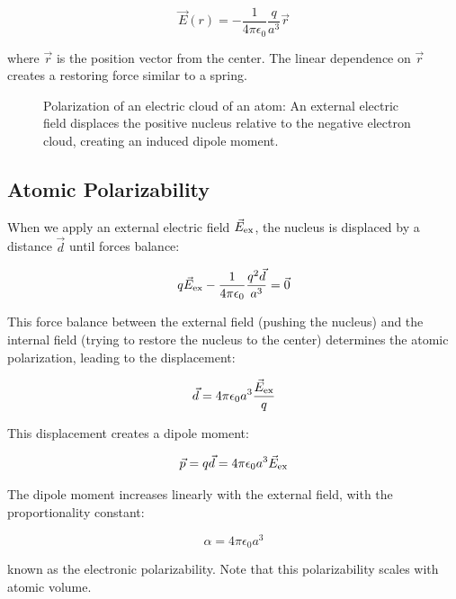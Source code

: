 \documentclass[
  a4paper,
]{book}
\begin{document}
\[
\vec{E}(r)=-\frac{1}{4\pi\epsilon_0}\frac{q}{a^3}\vec{r}
\]

where \(\vec{r}\) is the position vector from the center. The linear
dependence on \(\vec{r}\) creates a restoring force similar to a spring.

\begin{figure}


\caption{\label{fig-atom}Polarization of an electric cloud of an atom:
An external electric field displaces the positive nucleus relative to
the negative electron cloud, creating an induced dipole moment.}

\end{figure}%

\subsection{Atomic Polarizability}\label{atomic-polarizability}

When we apply an external electric field \(\vec{E}_{\rm ex}\), the
nucleus is displaced by a distance \(\vec{d}\) until forces balance:

\[
q\vec{E}_{\rm ex}-\frac{1}{4\pi\epsilon_0}\frac{q^2\vec{d}}{a^3}=\vec{0}
\]

This force balance between the external field (pushing the nucleus) and
the internal field (trying to restore the nucleus to the center)
determines the atomic polarization, leading to the displacement:

\[
\vec{d}=4\pi \epsilon_0 a^3 \frac{\vec{E}_{\rm ex}}{q}
\]

This displacement creates a dipole moment:

\[
\vec{p}=q\vec{d}=4\pi\epsilon_0 a^3 \vec{E}_{\rm ex}
\]

The dipole moment increases linearly with the external field, with the
proportionality constant:

\[
\alpha=4\pi \epsilon_0 a^3
\]

known as the electronic polarizability. Note that this polarizability
scales with atomic volume.
\end{document}
